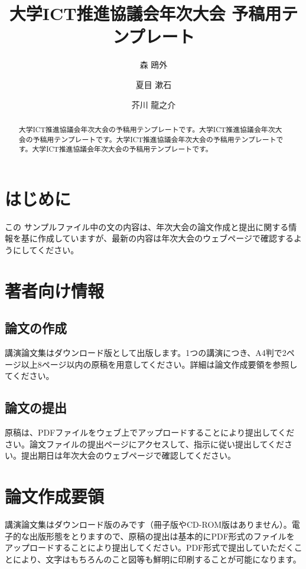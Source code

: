\documentclass[a4paper,twocolumn,10pt]{jsarticle}
\title{大学ICT推進協議会年次大会 予稿用テンプレート}
\author[1)]{森 鴎外}
\author[1),2)]{夏目 漱石}
\author[2)]{芥川 龍之介}
\affil[1)]{日本文学大学 情報センター}
\affil[2)]{日本文学大学 大学院文学研究科}
\date{}
\begin{document}
\begin{abstract}
大学ICT推進協議会年次大会の予稿用テンプレートです。大学ICT推進協議会年次大会の予稿用テンプレートです。大学ICT推進協議会年次大会の予稿用テンプレートです。大学ICT推進協議会年次大会の予稿用テンプレートです。	
\end{abstract}

\maketitle

\section{はじめに}

この サンプルファイル中の文の内容は、年次大会の論文作成と提出に関する情報を基に作成していますが、最新の内容は年次大会のウェブページで確認するようにしてください。 

\section{著者向け情報}
\subsection{論文の作成}

講演論文集はダウンロード版として出版します。1つの講演につき、A4判で2ページ以上8ページ以内の原稿を用意してください。詳細は論文作成要領を参照してください。

\subsection{論文の提出}

原稿は、PDFファイルをウェブ上でアップロードすることにより提出してください。論文ファイルの提出ページにアクセスして、指示に従い提出してください。提出期日は年次大会のウェブページで確認してください。

\section{論文作成要領}

講演論文集はダウンロード版のみです（冊子版やCD-ROM版はありません）。電子的な出版形態をとりますので、原稿の提出は基本的にPDF形式のファイルをアップロードすることにより提出してください。PDF形式で提出していただくことにより、文字はもちろんのこと図等も鮮明に印刷することが可能になります。 
\end{document}
